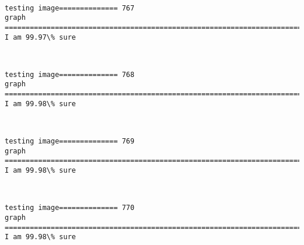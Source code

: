 \documentclass[11pt]{article}
\begin{document}
    \begin{center}
    \end{center}
    { \hspace*{\fill} \\}
    
    \begin{Verbatim}[commandchars=\\\{\}]
testing image============== 767
graph
============================================================================
I am 99.97\% sure

    \end{Verbatim}

    \begin{center}
    \end{center}
    { \hspace*{\fill} \\}
    
    \begin{Verbatim}[commandchars=\\\{\}]
testing image============== 768
graph
============================================================================
I am 99.98\% sure

    \end{Verbatim}

    \begin{center}
    \end{center}
    { \hspace*{\fill} \\}
    
    \begin{Verbatim}[commandchars=\\\{\}]
testing image============== 769
graph
============================================================================
I am 99.98\% sure

    \end{Verbatim}

    \begin{center}
    \end{center}
    { \hspace*{\fill} \\}
    
    \begin{Verbatim}[commandchars=\\\{\}]
testing image============== 770
graph
============================================================================
I am 99.98\% sure

    \end{Verbatim}
\end{document}
